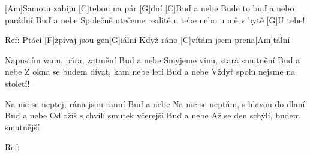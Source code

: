 
[Am]Samotu zabiju [C]tebou na pár [G]dní
[C]Buď a nebe
Bude to buď a nebo parádní
Buď a nebe
Společně utečeme realitě
u tebe nebo u mě v bytě
[G]U tebe!

Ref:
Ptáci [F]zpívaj jsou gen[G]iální
Když ráno [C]vítám jsem prena[Am]tální



Napustím vanu, pára, zatmění
Buď a nebe
Smyjeme vinu, stará smutnění
Buď a nebe
Z okna se budem dívat, kam nebe letí
Buď a nebe
Vždyť spolu nejsme na století!

Na nic se neptej, rána jsou ranní
Buď a nebe
Na nic se neptám, s hlavou do dlaní
Buď a nebe
Odložíš s chvílí smutek včerejší
Buď a nebe
Až se den schýlí, budem smutnější

Ref: